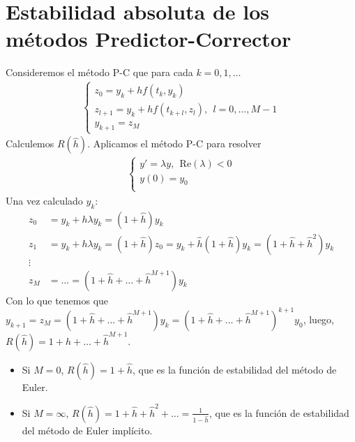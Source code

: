 \section{Estabilidad absoluta de los métodos Predictor-Corrector}
Consideremos el método P-C que para cada $k = 0,1,\ldots$
\begin{align*}
    \left\{ \begin{array}{lcc}
                z_0 = y_k + hf(t_k,y_k)                               \\
                z_{l+1} = y_k + hf(t_{k+l},z_l), \ \ l = 0,\ldots,M-1 \\
                y_{k+1} = z_M
            \end{array}
    \right.
\end{align*}
Calculemos $R(\hat{h})$. Aplicamos el método P-C para resolver
\begin{align*}
    \left\{ \begin{array}{lcc}
                y' = \lambda y, \ \ \text{Re}(\lambda) < 0 \\
                y(0) = y_0                                 \\
            \end{array}
    \right.
\end{align*}
Una vez calculado $y_k$:
\begin{align*}
    z_0 & = y_k + h\lambda y_k = (1 + \hat{h})y_k                                                                \\
    z_1 & = y_k + h\lambda y_k = (1 + \hat{h})z_0 = y_k + \hat{h}(1 + \hat{h})y_k = (1 + \hat{h} + \hat{h}^2)y_k \\
    \vdots                                                                                                       \\
    z_M & = \ldots = (1 + \hat{h} + \ldots + \hat{h}^{M+1})y_k
\end{align*}
Con lo que tenemos que $y_{k+1} = z_M = (1 + \hat{h} + \ldots + \hat{h}^{M+1})y_k = (1 + \hat{h} + \ldots + \hat{h}^{M+1})^{k+1}y_0$, luego, $R(\hat{h}) = 1 + \hat{h} + \ldots + \hat{h}^{M+1}$.
\begin{itemize}
    \item Si $M = 0$, $R(\hat{h}) = 1 + \hat{h}$, que es la función de estabilidad del método de Euler.
    \item Si $M = \infty$, $R(\hat{h}) = 1 + \hat{h} + \hat{h}^2 + \ldots = \frac{1}{ 1- \hat{h}}$, que es la función de estabilidad del método de Euler implícito.
\end{itemize}
